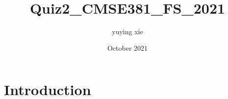 \documentclass{article}
\title{Quiz2_CMSE381_FS_2021}
\author{yuying xie}
\date{October 2021}
\begin{document}
\maketitle

\section{Introduction}
\end{document}
